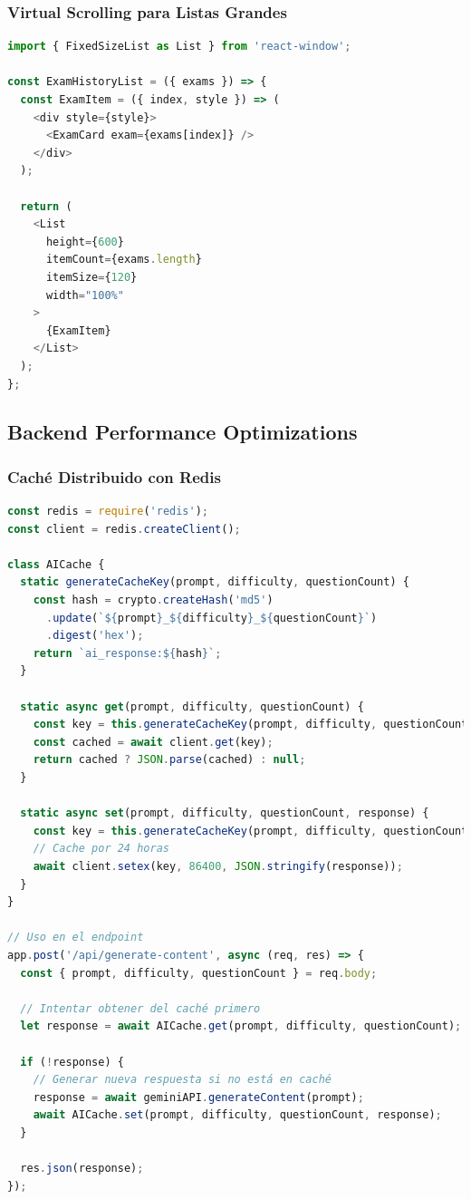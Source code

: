 \documentclass[12pt,a4paper]{report}
\begin{document}
\subsubsection{Virtual Scrolling para Listas Grandes}

\begin{lstlisting}[language=JavaScript, caption=Implementación de virtual scrolling]
import { FixedSizeList as List } from 'react-window';

const ExamHistoryList = ({ exams }) => {
  const ExamItem = ({ index, style }) => (
    <div style={style}>
      <ExamCard exam={exams[index]} />
    </div>
  );

  return (
    <List
      height={600}
      itemCount={exams.length}
      itemSize={120}
      width="100%"
    >
      {ExamItem}
    </List>
  );
};
\end{lstlisting}

\subsection{Backend Performance Optimizations}

\subsubsection{Caché Distribuido con Redis}

\begin{lstlisting}[language=JavaScript, caption=Implementación de caché para respuestas de IA]
const redis = require('redis');
const client = redis.createClient();

class AICache {
  static generateCacheKey(prompt, difficulty, questionCount) {
    const hash = crypto.createHash('md5')
      .update(`${prompt}_${difficulty}_${questionCount}`)
      .digest('hex');
    return `ai_response:${hash}`;
  }
  
  static async get(prompt, difficulty, questionCount) {
    const key = this.generateCacheKey(prompt, difficulty, questionCount);
    const cached = await client.get(key);
    return cached ? JSON.parse(cached) : null;
  }
  
  static async set(prompt, difficulty, questionCount, response) {
    const key = this.generateCacheKey(prompt, difficulty, questionCount);
    // Cache por 24 horas
    await client.setex(key, 86400, JSON.stringify(response));
  }
}

// Uso en el endpoint
app.post('/api/generate-content', async (req, res) => {
  const { prompt, difficulty, questionCount } = req.body;
  
  // Intentar obtener del caché primero
  let response = await AICache.get(prompt, difficulty, questionCount);
  
  if (!response) {
    // Generar nueva respuesta si no está en caché
    response = await geminiAPI.generateContent(prompt);
    await AICache.set(prompt, difficulty, questionCount, response);
  }
  
  res.json(response);
});
\end{lstlisting}
\end{document}
